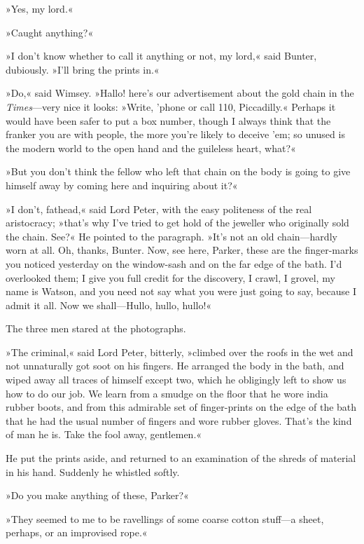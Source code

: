 »Yes, my lord.«

»Caught anything?«

»I don't know whether to call it anything or not, my lord,« said Bunter, dubiously. »I'll bring the prints in.«

»Do,« said Wimsey. »Hallo! here's our advertisement about the gold chain in the \textit{Times}---very nice it looks: »Write, 'phone or call 110, Piccadilly.« Perhaps it would have been safer to put a box number, though I always think that the franker you are with people, the more you're likely to deceive 'em; so unused is the modern world to the open hand and the guileless heart, what?«

»But you don't think the fellow who left that chain on the body is going to give himself away by coming here and inquiring about it?«

»I don't, fathead,« said Lord Peter, with the easy politeness of the real aristocracy; »that's why I've tried to get hold of the jeweller who originally sold the chain. See?« He pointed to the paragraph. »It's not an old chain\allowbreak---\allowbreak hardly worn at all. Oh, thanks, Bunter. Now, see here, Parker, these are the finger-marks you noticed yesterday on the window-sash and on the far edge of the bath. I'd overlooked them; I give you full credit for the discovery, I crawl, I grovel, my name is Watson, and you need not say what you were just going to say, because I admit it all. Now we shall\allowbreak---\allowbreak Hullo, hullo, hullo!«

The three men stared at the photographs.

»The criminal,« said Lord Peter, bitterly, »climbed over the roofs in the wet and not unnaturally got soot on his fingers. He arranged the body in the bath, and wiped away all traces of himself except two, which he obligingly left to show us how to do our job. We learn from a smudge on the floor that he wore india rubber boots, and from this admirable set of finger-prints on the edge of the bath that he had the usual number of fingers and wore rubber gloves. That's the kind of man he is. Take the fool away, gentlemen.«

He put the prints aside, and returned to an examination of the shreds of material in his hand. Suddenly he whistled softly.

»Do you make anything of these, Parker?«

»They seemed to me to be ravellings of some coarse cotton stuff\allowbreak---\allowbreak a sheet, perhaps, or an improvised rope.«

